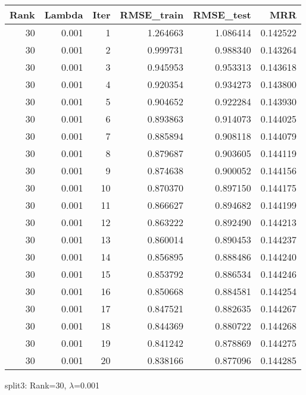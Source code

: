 \begin{tabular}{rrrrrr}
\toprule
 Rank &  Lambda &  Iter &  RMSE\_train &  RMSE\_test &       MRR \\
\midrule
   30 &   0.001 &     1 &    1.264663 &   1.086414 &  0.142522 \\
   30 &   0.001 &     2 &    0.999731 &   0.988340 &  0.143264 \\
   30 &   0.001 &     3 &    0.945953 &   0.953313 &  0.143618 \\
   30 &   0.001 &     4 &    0.920354 &   0.934273 &  0.143800 \\
   30 &   0.001 &     5 &    0.904652 &   0.922284 &  0.143930 \\
   30 &   0.001 &     6 &    0.893863 &   0.914073 &  0.144025 \\
   30 &   0.001 &     7 &    0.885894 &   0.908118 &  0.144079 \\
   30 &   0.001 &     8 &    0.879687 &   0.903605 &  0.144119 \\
   30 &   0.001 &     9 &    0.874638 &   0.900052 &  0.144156 \\
   30 &   0.001 &    10 &    0.870370 &   0.897150 &  0.144175 \\
   30 &   0.001 &    11 &    0.866627 &   0.894682 &  0.144199 \\
   30 &   0.001 &    12 &    0.863222 &   0.892490 &  0.144213 \\
   30 &   0.001 &    13 &    0.860014 &   0.890453 &  0.144237 \\
   30 &   0.001 &    14 &    0.856895 &   0.888486 &  0.144240 \\
   30 &   0.001 &    15 &    0.853792 &   0.886534 &  0.144246 \\
   30 &   0.001 &    16 &    0.850668 &   0.884581 &  0.144254 \\
   30 &   0.001 &    17 &    0.847521 &   0.882635 &  0.144267 \\
   30 &   0.001 &    18 &    0.844369 &   0.880722 &  0.144268 \\
   30 &   0.001 &    19 &    0.841242 &   0.878869 &  0.144275 \\
   30 &   0.001 &    20 &    0.838166 &   0.877096 &  0.144285 \\
\bottomrule
\end{tabular}

\caption{split3: Rank=30, $\lambda$=0.001}
